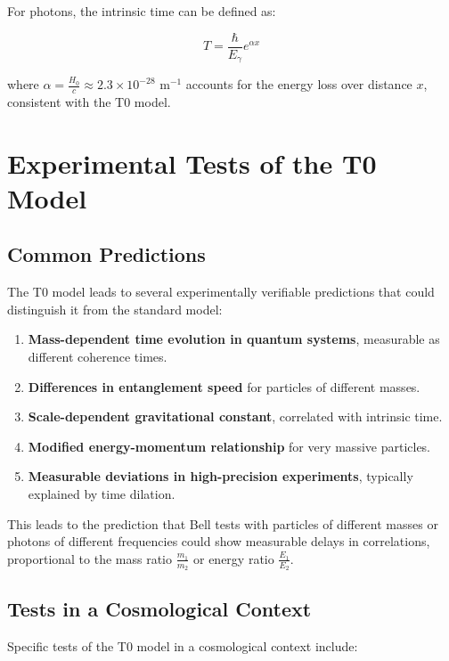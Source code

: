 \documentclass[a4paper,12pt]{article}
\theoremstyle{definition}
\theoremstyle{remark}
\begin{document}
	For photons, the intrinsic time can be defined as:
	
	\begin{equation}
		T = \frac{\hbar}{E_{\gamma}} e^{\alpha x}
	\end{equation}
	
	where $\alpha = \frac{H_0}{c} \approx 2.3 \times 10^{-28}$ m$^{-1}$ accounts for the energy loss over distance $x$, consistent with the T0 model.
	
	\section{Experimental Tests of the T0 Model}
	
	\subsection{Common Predictions}
	
	The T0 model leads to several experimentally verifiable predictions that could distinguish it from the standard model:
	
	\begin{enumerate}
		\item \textbf{Mass-dependent time evolution in quantum systems}, measurable as different coherence times.
		\item \textbf{Differences in entanglement speed} for particles of different masses.
		\item \textbf{Scale-dependent gravitational constant}, correlated with intrinsic time.
		\item \textbf{Modified energy-momentum relationship} for very massive particles.
		\item \textbf{Measurable deviations in high-precision experiments}, typically explained by time dilation.
	\end{enumerate}
	
	This leads to the prediction that Bell tests with particles of different masses or photons of different frequencies could show measurable delays in correlations, proportional to the mass ratio $\frac{m_1}{m_2}$ or energy ratio $\frac{E_1}{E_2}$.
	
	\subsection{Tests in a Cosmological Context}
	
	Specific tests of the T0 model in a cosmological context include:
	
\end{document}

